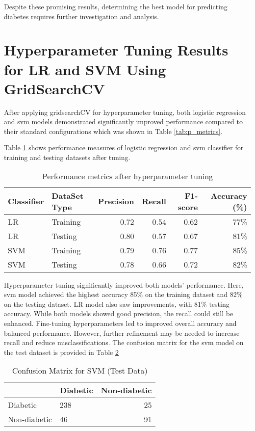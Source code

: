 Despite these promising results, determining the best model for predicting diabetes requires further investigation and analysis.

\section{Hyperparameter Tuning Results for LR and SVM Using GridSearchCV}
After applying gridsearchCV for hyperparameter tuning, both logistic regression and svm models demonstrated significantly improved performance compared to their standard configurations which was shown in Table \ref{tab:p_metrics}. 

Table \ref{tab:gs_p_metrics} shows performance measures of logistic regression and svm classifier for training and testing datasets after tuning.

\begin{table}[h!]
    \centering
    \caption{Performance metrics after hyperparameter tuning}
    \label{tab:gs_p_metrics}
    \begin{tabular}{llrrrr}     
        \toprule
        Classifier  &   DataSet Type &   Precision   &   Recall  &   F1-score    &   Accuracy (\%) \\
        \midrule
        LR  &   Training    &   0.72   &   0.54   &   0.62    &   77\%   \\
        LR  &   Testing &   0.80   &   0.57   &   0.67    &   81\%   \\
        SVM  &   Training    &   0.79   &   0.76   &   0.77    &   85\%   \\
        SVM  &   Testing &   0.78   &   0.66   &   0.72    &   82\%   \\
        \bottomrule
    \end{tabular}
\end{table}

Hyperparameter tuning significantly improved both models' performance. Here, svm model achieved the highest accuracy 85\% on the training dataset and 82\% on the testing dataset. LR model also saw improvements, with 81\% testing accuracy. While both models showed good precision, the recall could still be enhanced. Fine-tuning hyperparameters led to improved overall accuracy and balanced performance. However, further refinement may be needed to increase recall and reduce misclassifications. The confusion matrix for the svm model on the test dataset is provided in Table \ref{tab:gs_conf_matrix}

\begin{table}[h!]
    \centering
    \caption{Confusion Matrix for SVM (Test Data)}
    \label{tab:gs_conf_matrix}
    \begin{tabular}{llr}     
        \toprule
        & Diabetic  &   Non-diabetic \\
        \midrule
        Diabetic &  238  &   25   \\
        Non-diabetic &  46    &   91  \\
        \bottomrule
    \end{tabular}
\end{table}

